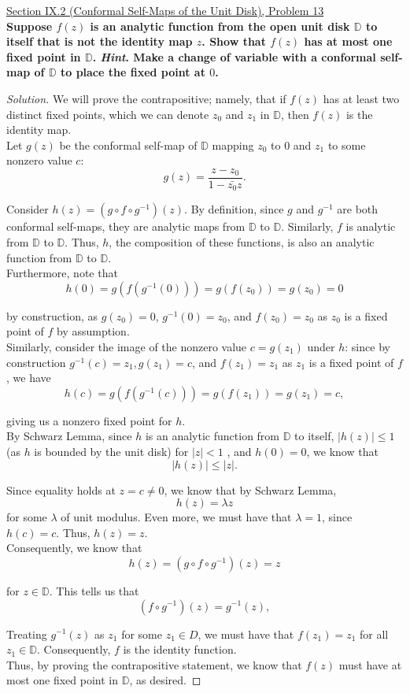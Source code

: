 \documentclass[11pt]{article}
\newcommand{\D}{\mathbb{D}}
\newenvironment{solution}
  {\renewcommand\qedsymbol{$\blacksquare$}\begin{proof}[Solution]}
  {\end{proof}}
\theoremstyle{definition}
\begin{document}
\newpage

\underline{Section IX.2 (Conformal Self-Maps of the Unit Disk), Problem 13}\\

\textbf{Suppose $f(z)$ is an analytic function from the open unit disk $\D$ to itself that is not the identity map $z$.
Show that $f(z)$ has at most one fixed point in $\D$. \textit{Hint}. Make a change of variable with a conformal self-map of $\D$ to place the fixed point at $0$.}

\begin{solution}
We will prove the contrapositive; namely, that if $f(z)$ has at least two distinct fixed points, which we can denote $z_0$ and $z_1$ in $\D$, then $f(z)$ is the identity map. \\


Let $g(z)$ be the conformal self-map of $\D$ mapping $z_0$ to $0$ and $z_1$ to some nonzero value $c$: \[ g(z) = \frac{z-z_0}{1-\bar{z_0}z}.\]

Consider $h(z) = (g \circ f \circ g^{-1})(z).$ By definition, since $g$ and $g^{-1}$ are both conformal self-maps, they are analytic maps from $\D$ to $\D$. Similarly, $f$ is analytic from $\D$ to $\D$. 
Thus, $h$, the composition of these functions, is also an analytic function from $\D$ to $\D$. \\

Furthermore, note that
\[ h(0) = g(f(g^{-1}(0))) = g(f(z_0)) = g(z_0) = 0\]

by construction, as $g(z_0) = 0$, $g^{-1}(0) = z_0$, and $f(z_0) = z_0$ as $z_0$ is a fixed point of $f$ by assumption. \\

Similarly, consider the image of the nonzero value $c = g(z_1)$ under $h$: since by construction $g^{-1}(c) = z_1, g(z_1) = c$, and $f(z_1) = z_1$ as $z_1$ is a fixed point of $f$, we have
\[ h(c) = g(f(g^{-1}(c))) = g(f(z_1)) = g(z_1) = c,\]

giving us a nonzero fixed point for $h$. \\

By Schwarz Lemma, since $h$ is an analytic function from $\D$ to itself, $|h(z)| \leq 1$ (as $h$ is bounded by the unit disk) for $|z| < 1$ , and $h(0) = 0$, we know that
\[ |h(z)| \leq |z|.\] 

Since equality holds at $z = c \neq 0$, we know that by Schwarz Lemma, \[h(z) = \lambda z\] for some $\lambda$ of unit modulus. Even more, we must have that $\lambda =1$, since $h(c) = c$. Thus, $h(z) = z$. \\
Consequently, we know that
\[ h(z) = (g \circ f \circ g^{-1})(z) = z \]

for $z \in \D$. This tells us that
\[ (f \circ g^{-1})(z) = g^{-1}(z),\]

Treating $g^{-1}(z)$ as $z_1$ for some $z_1 \in D$, we must have that $f(z_1) = z_1$ for all $z_1 \in \D$. Consequently, $f$ is the identity function. \\

Thus, by proving the contrapositive statement, we know that $f(z)$ must have at most one fixed point in $\D$, as desired.\end{solution}
\end{document}
